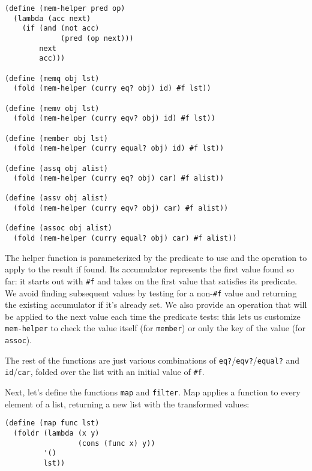 \begin{lstlisting}
(define (mem-helper pred op)
  (lambda (acc next) 
    (if (and (not acc)
             (pred (op next)))
        next
        acc)))
 
(define (memq obj lst)
  (fold (mem-helper (curry eq? obj) id) #f lst))
 
(define (memv obj lst)
  (fold (mem-helper (curry eqv? obj) id) #f lst))
 
(define (member obj lst)
  (fold (mem-helper (curry equal? obj) id) #f lst))
 
(define (assq obj alist)
  (fold (mem-helper (curry eq? obj) car) #f alist))
 
(define (assv obj alist)
  (fold (mem-helper (curry eqv? obj) car) #f alist))
 
(define (assoc obj alist)
  (fold (mem-helper (curry equal? obj) car) #f alist))
\end{lstlisting}
 
The helper function is parameterized by the predicate to use and the operation to apply to the result if found. Its accumulator represents the first value found so far: it starts out with \verb|#f| and takes on the first value that satisfies its predicate. We avoid finding subsequent values by testing for a non-\verb|#f| value and returning the existing accumulator if it's already set. We also provide an operation that will be applied to the next value each time the predicate tests: this lets us customize \verb|mem-helper| to check the value itself (for \verb|member|) or only the key of the value (for \verb|assoc|).
 
The rest of the functions are just various combinations of \verb|eq?|/\verb|eqv?|/\verb|equal?| and \verb|id|/\verb|car|, folded over the list with an initial value of \verb|#f|.
 
Next, let's define the functions \verb|map| and \verb|filter|. Map applies a function to every element of a list, returning a new list with the transformed values:
 
\begin{lstlisting}
(define (map func lst)
  (foldr (lambda (x y)
                 (cons (func x) y))
         '()
         lst))
\end{lstlisting}
 
